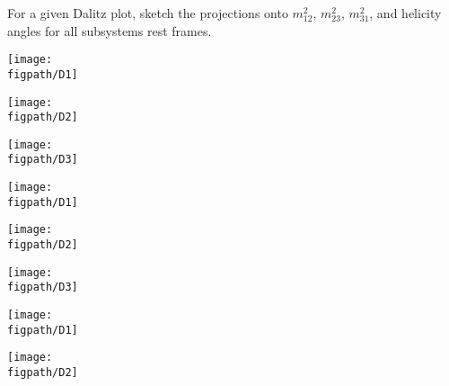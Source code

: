 For a given Dalitz plot, sketch the projections onto $m_{12}^2$, $m_{23}^2$, $m_{31}^2$,
and helicity angles for all subsystems rest frames.

\begin{center}
    \centering
    \begin{minipage}[c]{0.22\textwidth}
        \texttt{[image: \\figpath/D1]}
    \end{minipage}
    \hfill
    \begin{minipage}[c]{0.22\textwidth}
        \texttt{[image: \\figpath/D2]}
    \end{minipage}
    \hfill
    \begin{minipage}[c]{0.22\textwidth}
        \texttt{[image: \\figpath/D3]}
    \end{minipage}
    \hfill
    \begin{minipage}[c]{0.22\textwidth}
        \texttt{[image: \\figpath/D1]}
    \end{minipage}
    \begin{minipage}[c]{0.22\textwidth}
        \texttt{[image: \\figpath/D2]}
    \end{minipage}
    \hfill
    \begin{minipage}[c]{0.22\textwidth}
        \texttt{[image: \\figpath/D3]}
    \end{minipage}
    \hfill
    \begin{minipage}[c]{0.22\textwidth}
        \texttt{[image: \\figpath/D1]}
    \end{minipage}
    \hfill
    \begin{minipage}[c]{0.22\textwidth}
        \texttt{[image: \\figpath/D2]}
    \end{minipage}
\end{center}
